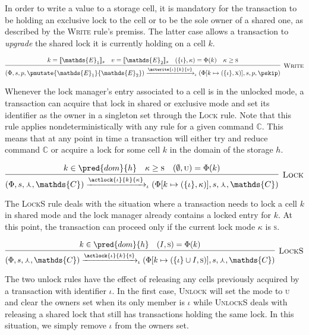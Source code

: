 In order to write a value to a storage cell, it is mandatory for the transaction to be holding an exclusive lock to the cell or to be the sole owner of a shared one, as described by the \textsc{Write} rule's premiss. The latter case allows a transaction to \textit{upgrade} the shared lock it is currently holding on a cell $k$.

\[
\infer[\textsc{Write}]
{
	(\Phi, s, p, \pmutate{\mathds{E}_1}{\mathds{E}_2})
	\xrightarrow{\actwrite{\iota}{k}{v}}_\iota
	(\Phi[k \mapsto (\{\iota\}, \textsc{x})], s, p, \pskip)
}
{
	k = \llbracket \mathds{E}_1 \rrbracket_s &
	v = \llbracket \mathds{E}_2 \rrbracket_s &
	(\{ \iota \}, \kappa) = \Phi(k) &
	\kappa \geq \textsc{s}
}
\]

Whenever the lock manager's entry associated to a cell is in the unlocked mode, a transaction can acquire that lock in shared or exclusive mode and set its identifier as the owner in a singleton set through the \textsc{Lock} rule. Note that this rule applies nondeterministically with any rule for a given command $\mathds{C}$. This means that at any point in time a transaction will either try and reduce command $\mathds{C}$ or acquire a lock for some cell $k$ in the domain of the storage $h$.

\[
\infer[\textsc{Lock}]
{
	(\Phi, s, \curlywedge, \mathds{C})
	\xrightarrow{\actlock{\iota}{k}{\kappa}}_\iota
	(\Phi[k \mapsto (\{\iota\}, \kappa)], s, \curlywedge, \mathds{C})
}
{
	k \in \pred{dom}{h} &
	\kappa \geq \textsc{s} &
	(\emptyset, \textsc{u}) = \Phi(k)
}
\]

The \textsc{LockS} rule deals with the situation where a transaction needs to lock a cell $k$ in shared mode and the lock manager already contains a locked entry for $k$. At this point, the transaction can proceed only if the current lock mode $\kappa$ is \textsc{s}.

\[
\infer[\textsc{LockS}]
{
	(\Phi, s, \curlywedge, \mathds{C})
	\xrightarrow{\actlock{\iota}{k}{\textsc{s}}}_\iota
	(\Phi[k \mapsto (\{\iota\} \cup I, \textsc{s})], s, \curlywedge, \mathds{C})
}
{
	k \in \pred{dom}{h} &
	(I, \textsc{s}) = \Phi(k)
}
\]

The two unlock rules have the effect of releasing any cells previously acquired by a transaction with identifier $\iota$. In the first case, \textsc{Unlock} will set the mode to \textsc{u} and clear the owners set when its only member is $\iota$ while \textsc{UnlockS} deals with releasing a shared lock that still has transactions holding the same lock. In this situation, we simply remove $\iota$ from the owners set.

